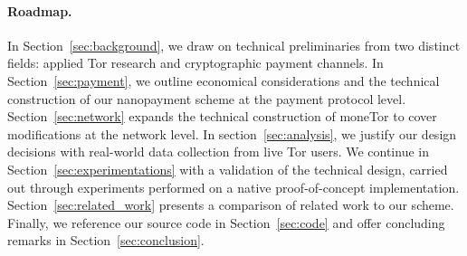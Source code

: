\paragraph*{Roadmap.} In Section~\ref{sec:background}, we draw on technical
preliminaries from two distinct fields: applied Tor research and cryptographic
payment channels.
In Section~\ref{sec:payment}, we outline economical considerations and the
technical construction of our nanopayment scheme at the payment protocol level.
Section~\ref{sec:network} expands the technical construction of moneTor to cover
modifications at the network level. In section~\ref{sec:analysis}, we justify
our design decisions with real-world data collection from live Tor users. We
continue in Section~\ref{sec:experimentations} with a validation of the
technical design, carried out through experiments performed on a native
proof-of-concept implementation. Section~\ref{sec:related_work} presents a
comparison of related work to our scheme. Finally, we reference our source code
in Section~\ref{sec:code} and offer concluding remarks in
Section~\ref{sec:conclusion}.

